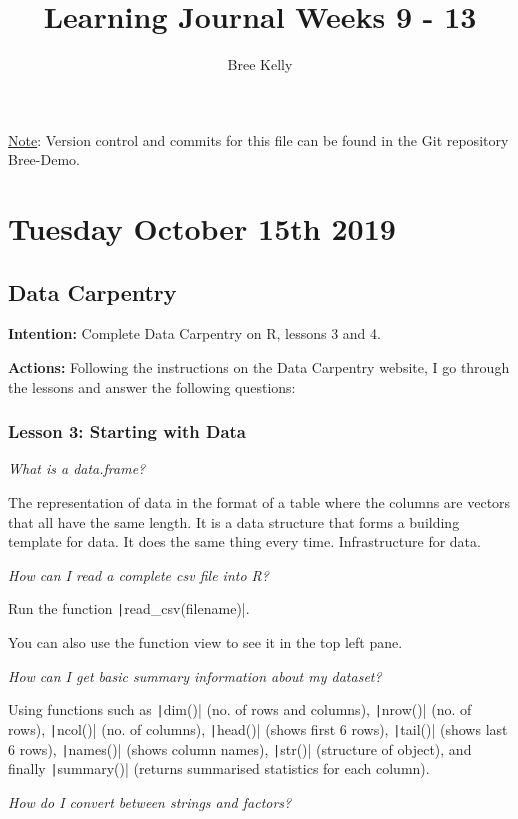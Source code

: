 \documentclass{article}
\title{Learning Journal Weeks 9 - 13}
\author{Bree Kelly}
\date{}
\begin{document}
\maketitle

\tablesofcontentsanderrors
\underline{Note}: Version control and commits for this file can be found in the Git repository Bree-Demo.

\newpage
\section{Tuesday October 15th 2019}

\subsection{Data Carpentry}
\textbf{Intention:} Complete Data Carpentry on R, lessons 3 and 4.

\textbf{Actions:} Following the instructions on the Data Carpentry website, I go through the lessons and answer the following questions:

\subsubsection{Lesson 3: Starting with Data}

\textit{What is a data.frame?}

The representation of data in the format of a table where the columns are vectors that all have the same length. It is a data structure that forms a building template for data. It does the same thing every time. Infrastructure for data.

\textit{How can I read a complete csv file into R?}

Run the function \texttt|read_csv(filename)|. 

You can also use the function view to see it in the top left pane.

\textit{How can I get basic summary information about my dataset?}

Using functions such as \texttt|dim()| (no. of rows and columns), \texttt|nrow()| (no. of rows), \texttt|ncol()| (no. of columns), \texttt|head()| (shows first 6 rows), \texttt|tail()| (shows last 6 rows), \texttt|names()| (shows column names), \texttt|str()| (structure of object), and finally \texttt|summary()| (returns summarised statistics for each column).

\textit{How do I convert between strings and factors?}
\end{document}
